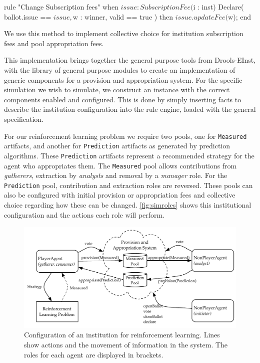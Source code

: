 \begin{droolsinline}
rule "Change Subscription fees"
	when
		$issue : SubscriptionFee($i : inst)
		Declare( ballot.issue == $issue, $w : winner, valid == true )
	then
		$issue.updateFee($w);
end
\end{droolsinline}

We use this method to implement collective choice for institution subscription
fees and pool appropriation fees.


This implementation brings together the general purpose tools from Drools-EInst,
with the library of general purpose modules to create an implementation
of generic components for a provision and appropriation system. For the
specific simulation we wish to simulate, we construct an instance with the
correct components enabled and configured. This is done by simply inserting facts to describe the institution configuration into the rule engine, loaded with the general
specification.

For our reinforcement learning problem we require two pools, one for
\texttt{Measured} artifacts, and another for \texttt{Prediction} artifacts as generated by prediction algorithms. 
These \texttt{Prediction} artifacts represent a recommended strategy for the agent who appropriates them.
The \texttt{Measured} pool allows contributions from \emph{gatherers}, extraction
by \emph{analysts} and removal by a \emph{manager} role. For the \texttt{Prediction} pool,
contribution and extraction roles are reversed.  
These pools can also be
configured with initial provision or appropriation fees and collective choice
regarding how these can be changed. \autoref{fig:simroles} shows this institutional configuration and the actions each role will perform.

\begin{figure}
\centering
\includegraphics[width=\textwidth]{gfx/simulation_roles}
\caption[Configuration of an institution for reinforcement learning.]{Configuration of an institution for reinforcement learning. Lines show actions and the movement of information in the system. The roles for each agent are displayed in brackets.}\label{fig:simroles}
\end{figure}

